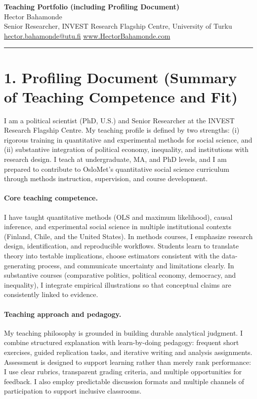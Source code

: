 \documentclass[letterpaper,11pt]{article}
\begin{document}
\vspace*{-0.6cm}

{\Large \textbf{Teaching Portfolio (including Profiling Document)}}\\
{\normalsize Hector Bahamonde}\\
{\normalsize Senior Researcher, INVEST Research Flagship Centre, University of Turku}\\
{\normalsize \href{mailto:hector.bahamonde@utu.fi}{hector.bahamonde@utu.fi} \quad \textbullet \quad
\href{http://www.hectorbahamonde.com}{www.HectorBahamonde.com}}

\noindent\rule[0.5ex]{\linewidth}{0.4pt}

\section*{1. Profiling Document (Summary of Teaching Competence and Fit)}

I am a political scientist (PhD, U.S.) and Senior Researcher at the INVEST Research Flagship Centre. My teaching profile is defined by two strengths: (i) rigorous training in quantitative and experimental methods for social science, and (ii) substantive integration of political economy, inequality, and institutions with research design. I teach at undergraduate, MA, and PhD levels, and I am prepared to contribute to OsloMet's quantitative social science curriculum through methods instruction, supervision, and course development.

\paragraph{Core teaching competence.}
I have taught quantitative methods (OLS and maximum likelihood), causal inference, and experimental social science in multiple institutional contexts (Finland, Chile, and the United States). In methods courses, I emphasize research design, identification, and reproducible workflows. Students learn to translate theory into testable implications, choose estimators consistent with the data-generating process, and communicate uncertainty and limitations clearly. In substantive courses (comparative politics, political economy, democracy, and inequality), I integrate empirical illustrations so that conceptual claims are consistently linked to evidence.

\paragraph{Teaching approach and pedagogy.}
My teaching philosophy is grounded in building durable analytical judgment. I combine structured explanation with learn-by-doing pedagogy: frequent short exercises, guided replication tasks, and iterative writing and analysis assignments. Assessment is designed to support learning rather than merely rank performance: I use clear rubrics, transparent grading criteria, and multiple opportunities for feedback. I also employ predictable discussion formats and multiple channels of participation to support inclusive classrooms.
\end{document}
